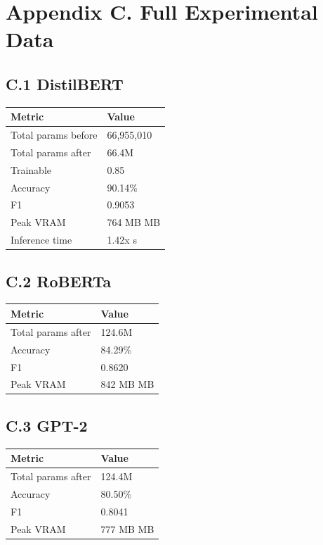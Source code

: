 \section{Appendix C. Full Experimental Data}

\subsection{C.1 DistilBERT}

\begin{table}[H]
\centering
\small
\begin{tabular}{ll}
\toprule
\textbf{Metric} & \textbf{Value} \\
\midrule
Total params before & 66,955,010 \\
Total params after & 66.4M \\
Trainable & 0.85 \\
Accuracy & 90.14\% \\
F1 & 0.9053 \\
Peak VRAM & 764 MB MB \\
Inference time & 1.42x s \\
\bottomrule
\end{tabular}
\end{table}

\subsection{C.2 RoBERTa}

\begin{table}[H]
\centering
\small
\begin{tabular}{ll}
\toprule
\textbf{Metric} & \textbf{Value} \\
\midrule
Total params after & 124.6M \\
Accuracy & 84.29\% \\
F1 & 0.8620 \\
Peak VRAM & 842 MB MB \\
\bottomrule
\end{tabular}
\end{table}

\subsection{C.3 GPT-2}

\begin{table}[H]
\centering
\small
\begin{tabular}{ll}
\toprule
\textbf{Metric} & \textbf{Value} \\
\midrule
Total params after & 124.4M \\
Accuracy & 80.50\% \\
F1 & 0.8041 \\
Peak VRAM & 777 MB MB \\
\bottomrule
\end{tabular}
\end{table}

